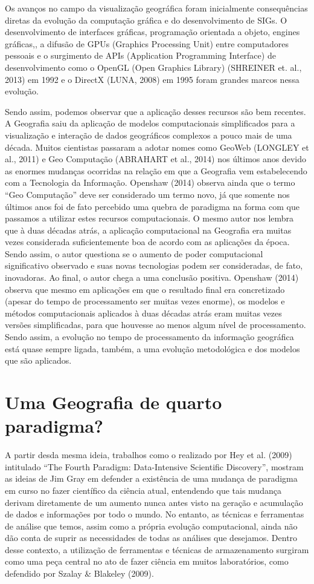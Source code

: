 Os avanços no campo da visualização geográfica foram inicialmente consequências diretas da evolução da computação gráfica e do desenvolvimento de SIGs. O desenvolvimento de interfaces gráficas, programação orientada a objeto, engines gráficas,, a difusão de GPUs (Graphics Processing Unit) entre computadores pessoais e o surgimento de APIs (Application Programming Interface) de desenvolvimento como o OpenGL (Open Graphics Library) (SHREINER et. al., 2013) em 1992 e o DirectX (LUNA, 2008) em 1995 foram grandes marcos nessa evolução. 

Sendo assim, podemos observar que a aplicação desses recursos são bem recentes. A Geografia saiu da aplicação de modelos computacionais simplificados para a visualização e interação de dados geográficos complexos a pouco mais de uma década. Muitos cientistas passaram a adotar nomes como GeoWeb (LONGLEY et al., 2011)  e Geo Computação (ABRAHART et al., 2014) nos últimos anos devido as enormes mudanças ocorridas na relação em que a Geografia vem estabelecendo com a Tecnologia da Informação. Openshaw (2014) observa ainda que o termo “Geo Computação” deve ser considerado um termo novo, já que somente nos últimos anos foi de fato percebido uma quebra de paradigma na forma com que passamos a utilizar estes recursos computacionais. O mesmo autor nos lembra que à duas décadas atrás, a aplicação computacional na Geografia era muitas vezes considerada suficientemente boa de acordo com as aplicações da época. Sendo assim, o autor questiona se o aumento de poder computacional significativo observado e suas novas tecnologias podem ser consideradas, de fato, inovadoras. Ao final, o autor chega a uma conclusão positiva. Openshaw (2014) observa que mesmo em aplicações em que o resultado final era concretizado (apesar do tempo de processamento ser muitas vezes enorme), os modelos e métodos computacionais aplicados à duas décadas atrás eram muitas vezes versões simplificadas, para que houvesse ao menos algum nível de processamento. Sendo assim, a evolução no tempo de processamento da informação geográfica está quase sempre ligada, também, a uma evolução metodológica e dos modelos que são aplicados. 

\chapter{Uma Geografia de quarto paradigma?}
A partir desda mesma ideia, trabalhos como o realizado por Hey et al. (2009) intitulado “The Fourth Paradigm: Data-Intensive Scientific Discovery”, mostram as ideias de Jim Gray em defender a existência de uma mudança de paradigma em curso no fazer científico da ciência atual, entendendo que tais mudança derivam diretamente de um aumento nunca antes visto na geração e acumulação de dados e informações por todo o mundo. No entanto, as técnicas e ferramentas de análise que temos, assim como a própria evolução computacional, ainda não dão conta de suprir as necessidades de todas as análises que desejamos. Dentro desse contexto, a utilização de ferramentas e técnicas de armazenamento surgiram como uma peça central no ato de fazer ciência em muitos laboratórios, como defendido por Szalay \& Blakeley (2009). 

